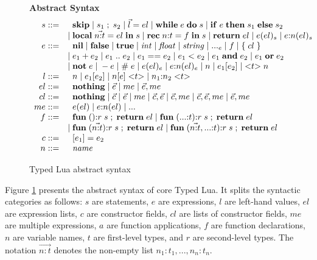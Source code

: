 \begin{figure}[!ht]
\textbf{Abstract Syntax}\\
\dstart
$$
\begin{array}{rl}
s ::= & \;\; \mathbf{skip} \; | \;
s_{1} \; ; \; s_{2} \; | \;
\vec{l} = el \; | \;
\mathbf{while} \; e \; \mathbf{do} \; s \; | \;
\mathbf{if} \; e \; \mathbf{then} \; s_{1} \; \mathbf{else} \; s_{2}\\
& | \; \mathbf{local} \; \vec{n{:}t} = el \; \mathbf{in} \; s \; | \;
\mathbf{rec} \; n{:}t = f \; \mathbf{in} \; s \; | \;
\mathbf{return} \; el \; | \;
e(el)_{s} \; | \;
e{:}n(el)_{s}\\
e ::= & \;\; \mathbf{nil} \; | \;
\mathbf{false} \; | \;
\mathbf{true} \; | \;
{\it int} \; | \;
{\it float} \; | \;
{\it string} \; | \;
{...}_{e} \; | \;
f \; | \;
\{ \; cl \; \} \\
& | \; e_{1} + e_{2} \; | \;
e_{1} \; {..} \; e_{2} \; | \;
e_{1} == e_{2} \; | \;
e_{1} < e_{2} \; | \;
e_{1} \; \mathbf{and} \; e_{2} \; | \;
e_{1} \; \mathbf{or} \; e_{2} \\
& | \; \mathbf{not} \; e \; | \;
- e \; | \;
\# \; e \; | \;
e(el)_{e} \; | \;
e{:}n(el)_{e} \; | \;
n \; | \;
e_{1}[e_{2}] \; | \;
{<}t{>} \; n\\
l ::= & \;\; n \; | \;
e_{1}[e_{2}] \; | \;
n[e] \; {<}t{>} \; | \;
n_{1}{:}n_{2} \; {<}t{>}\\
el ::= & \;\; \mathbf{nothing} \; | \;
\vec{e} \; | \;
me \; | \;
\vec{e}, me\\
cl ::= & \;\; \mathbf{nothing} \; | \;
\vec{c} \; | \;
\vec{e} \; | \;
me \; | \;
\vec{c}, \vec{e} \; | \;
\vec{c}, me \; | \;
\vec{c}, \vec{e}, me \; | \;
\vec{e}, me\\
me ::= & \;\; e(el) \; | \;
e{:}n(el) \; | \;
{...}\\
f ::= & \;\; \mathbf{fun} \; (){:}r \; s \; ; \; \mathbf{return} \; el \; | \;
\mathbf{fun} \; ({...}{:}t){:}r \; s \; ; \; \mathbf{return} \; el\\
& | \; \mathbf{fun} \; (\vec{n{:}t}){:}r \; s \; ; \; \mathbf{return} \; el \; | \;
\mathbf{fun} \; (\vec{n{:}t},{...}{:}t){:}r \; s \; ; \; \mathbf{return} \; el\\
c ::= & \;\; [e_{1}] = e_{2}\\
n ::= & \;\; {\it name}\\
\end{array}
$$
\dend
\caption{Typed Lua abstract syntax}
\label{fig:syntax}
\end{figure}

Figure \ref{fig:syntax} presents the abstract syntax of core Typed Lua.
It splits the syntactic categories as follows:
$s$ are statements, $e$ are expressions, $l$ are left-hand values,
$el$ are expression lists, $c$ are constructor fields, $cl$ are lists of
constructor fields, $me$ are multiple expressions, $a$ are function
applications, $f$ are function declarations, $n$ are variable names,
$t$ are first-level types, and $r$ are second-level types.
The notation $\vec{n{:}t}$ denotes the non-empty list
$n_{1}{:}t_{1}, ..., n_{n}{:}t_{n}$.

